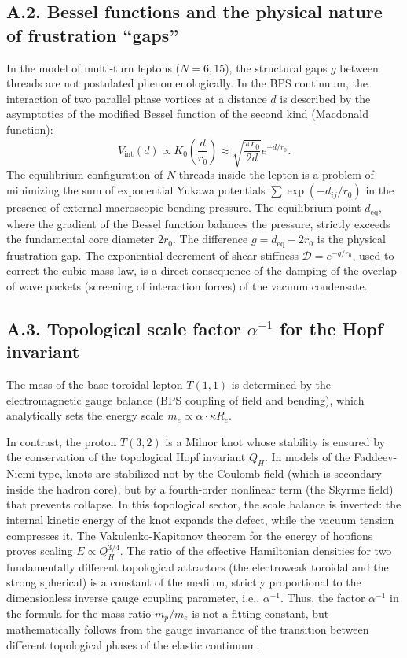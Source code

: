 \documentclass[11pt,a4paper]{article}
\begin{document}
\subsection*{A.2. Bessel functions and the physical nature of frustration ``gaps''}
In the model of multi-turn leptons ($N=6, 15$), the structural gaps $g$ between threads are not postulated phenomenologically. In the BPS continuum, the interaction of two parallel phase vortices at a distance $d$ is described by the asymptotics of the modified Bessel function of the second kind (Macdonald function):
\begin{equation}
V_{\text{int}}(d) \propto K_0\left(\frac{d}{r_0}\right) \approx \sqrt{\frac{\pi r_0}{2d}} e^{-d/r_0}.
\end{equation}
The equilibrium configuration of $N$ threads inside the lepton is a problem of minimizing the sum of exponential Yukawa potentials $\sum \exp(-d_{ij}/r_0)$ in the presence of external macroscopic bending pressure. The equilibrium point $d_{\text{eq}}$, where the gradient of the Bessel function balances the pressure, strictly exceeds the fundamental core diameter $2r_0$. 
The difference $g = d_{\text{eq}} - 2r_0$ is the physical frustration gap. The exponential decrement of shear stiffness $\mathcal{D} = e^{-g/r_0}$, used to correct the cubic mass law, is a direct consequence of the damping of the overlap of wave packets (screening of interaction forces) of the vacuum condensate.

\subsection*{A.3. Topological scale factor $\alpha^{-1}$ for the Hopf invariant}
The mass of the base toroidal lepton $T(1,1)$ is determined by the electromagnetic gauge balance (BPS coupling of field and bending), which analytically sets the energy scale $m_e \propto \alpha \cdot \kappa R_e$.

In contrast, the proton $T(3,2)$ is a Milnor knot whose stability is ensured by the conservation of the topological Hopf invariant $Q_H$. In models of the Faddeev-Niemi type, knots are stabilized not by the Coulomb field (which is secondary inside the hadron core), but by a fourth-order nonlinear term (the Skyrme field) that prevents collapse. 
In this topological sector, the scale balance is inverted: the internal kinetic energy of the knot expands the defect, while the vacuum tension compresses it. The Vakulenko-Kapitonov theorem for the energy of hopfions proves scaling $E \propto Q_H^{3/4}$. The ratio of the effective Hamiltonian densities for two fundamentally different topological attractors (the electroweak toroidal and the strong spherical) is a constant of the medium, strictly proportional to the dimensionless inverse gauge coupling parameter, i.e., $\alpha^{-1}$.
Thus, the factor $\alpha^{-1}$ in the formula for the mass ratio $m_p/m_e$ is not a fitting constant, but mathematically follows from the gauge invariance of the transition between different topological phases of the elastic continuum.
\end{document}
